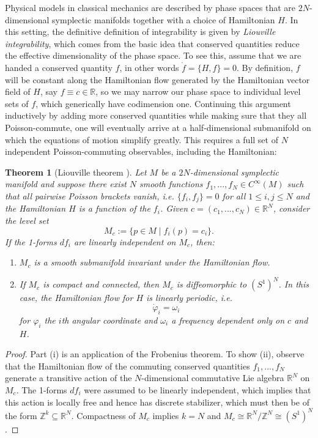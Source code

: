 \documentclass[11pt]{report}
\newtheorem{theorem}{Theorem}[section]
\theoremstyle{definition}
\theoremstyle{remark}
\theoremstyle{remark}
\newcommand{\Z}{\mathbb{Z}}
\newcommand{\R}{\mathbb{R}}
\begin{document}
Physical models in classical mechanics are described by phase spaces that are $2N$-dimensional symplectic manifolds together with a choice of Hamiltonian $H$. In this setting, the definitive definition of integrability is given by \emph{Liouville integrability}, which comes from the basic idea that conserved quantities reduce the effective dimensionality of the phase space. To see this, assume that we are handed a conserved quantity $f$, in other words $\dot f = \{ H, f \} = 0$. By definition, $f$ will be constant along the Hamiltonian flow generated by the Hamiltonian vector field of $H$, say $f \equiv c \in \R$, so we may narrow our phase space to individual level sets of $f$, which generically have codimension one. Continuing this argument inductively by adding more conserved quantities while making sure that they all Poisson-commute, one will eventually arrive at a half-dimensional submanifold on which the equations of motion simplify greatly. This requires a full set of $N$ independent Poisson-commuting observables, including the Hamiltonian:

\begin{theorem}[Liouville theorem \cite{book:arnold}] 
Let $M$ be a $2N$-dimensional symplectic manifold and suppose there exist $N$ smooth functions $f_1,...,f_N \in C^\infty(M)$ such that all pairwise Poisson brackets vanish, \emph{i.e.} $\{ f_i,f_j \} = 0$ for all $1 \leq i,j \leq N$ and the Hamiltonian $H$ is a function of the $f_i$. Given $c = (c_1,...,c_N) \in \R^N$, consider the level set
\begin{equation*}
M_c := \{ p \in M \mid f_i(p) = c_i \}.
\end{equation*}
If the 1-forms $df_i$ are linearly independent on $M_c$, then:
\begin{enumerate}[label=(\roman*)]
\item $M_c$ is a smooth submanifold invariant under the Hamiltonian flow.
\item If $M_c$ is compact and connected, then $M_c$ is diffeomorphic to $(S^1)^N$. In this case, the Hamiltonian flow for $H$ is linearly periodic, \emph{i.e.}
\begin{equation*}
\dot \varphi_i = \omega_i
\end{equation*}
for $\varphi_i$ the $i$th angular coordinate and $\omega_i$ a frequency dependent only on $c$ and $H$.
\end{enumerate}
\end{theorem}

\begin{proof}
Part (i) is an application of the Frobenius theorem. To show (ii), observe that the Hamiltonian flow of the commuting conserved quantities $f_1,...,f_N$ generate a transitive action of the $N$-dimensional commutative Lie algebra $\R^N$ on $M_c$. The 1-forms $df_i$ were assumed to be linearly independent, which implies that this action is locally free and hence has discrete stabilizer, which must then be of the form $\Z^k \subseteq \R^N$. Compactness of $M_c$ implies $k=N$ and $M_c \cong \R^N / \Z^N \cong (S^1)^N$.
\end{proof}
\end{document}
